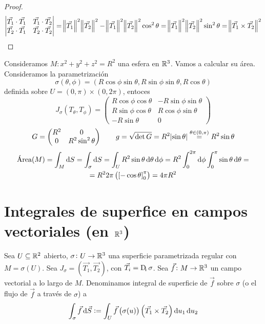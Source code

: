 \begin{proof}
    \[
        \begin{vmatrix}\vec{T_1}\cdot \vec{T_1} & \vec{T_1} \cdot \vec{T_2} \\ \vec{T_2}\cdot\vec{T_1} & \vec{T_2}\cdot\vec{T_2}\end{vmatrix} =
        \norm{\vec{T_1}}^2 \norm{\vec{T_2}}^2 - \norm{\vec{T_1}}^2\norm{\vec{T_2}}^2 \cos^2 \theta = \norm{\vec{T_1}}^2\norm{\vec{T_2}}^2 \sin^2 \theta
        = \norm{\vec{T_1} \times \vec{T_2}}^2
    \]
\end{proof}

\begin{example*}
    Consideramos $M: x^2 + y^2 + z^2 = R^2$ una esfera en $\mathbb{R}^3$. Vamos a calcular su área. Consideramos la parametrización
    \[
        \sigma(\theta, \phi) = \left( R \cos \phi \sin \theta, R \sin\phi \sin \theta, R \cos \theta \right)
    \]
    definida sobre $U = (0,\pi) \times (0,2\pi)$, entoces
    \[
        J_\sigma\left( T_\theta, T_\phi \right) =
        \begin{pmatrix}
            R \cos \phi \cos \theta & - R \sin\phi\sin\theta \\
            R \sin \phi \cos \theta & R \cos\phi\sin\theta \\
            -R\sin\theta & 0
        \end{pmatrix}
    \]
    \[
        G =
        \begin{pmatrix}
            R^2 & 0 \\ 0 & R^2 \sin^2\theta
        \end{pmatrix}
        \qquad
        g = \sqrt{\det G} = R^2 \abs{\sin \theta} \stackrel{\theta \in (0,\pi)}{=} R^2 \sin \theta
    \]
    \begin{gather*}
        \text{Área}(M) = \int_M \dif S = \int_\sigma \dif S = \int_U R^2 \sin \theta \dif \theta \dif \phi = R^2 \int^{2\pi}_0 \dif\phi \int^\pi_0 \sin \theta \dif \theta = \\
        = R^2 2\pi \left( \left[ -\cos\theta \right]^\pi_0 \right) = 4\pi R^2
    \end{gather*}
\end{example*}

\section{Integrales de superfice en campos vectoriales (en $\mathbb{R}^3$)}

\begin{defi}
    Sea $U \subseteq \mathbb{R}^2$ abierto, $\sigma \colon U \to \mathbb{R}^3$ una superficie parametrizada regular con
    $M = \sigma(U)$. Sea $J_\sigma = \left( \vec{T_1}, \vec{T_2} \right)$, con $\vec{T_i} = \Dif_i \sigma$.
    Sea $\vec{f} \colon M \to \mathbb{R}^3$ un campo vectorial a lo largo de $M$. Denominamos integral de superficie de $\vec{f}$
    sobre $\sigma$ (o el flujo de $\vec{f}$ a trav\'es de $\sigma$) a
    \[
        \int_\sigma \vec{f} \dif \vec{S} := \int_U \vec{f}\left( \sigma(u) \right) \left( \vec{T_1} \times \vec{T_2} \right) \dif u_1 \dif u_2
    \]
\end{defi}

